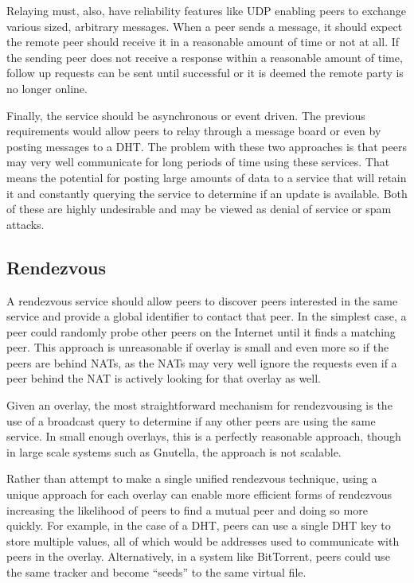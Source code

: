 \documentclass[conference]{IEEEtran}
\begin{document}
Relaying must, also, have reliability features like UDP enabling peers to
exchange various sized, arbitrary messages.  When a peer sends a message, it
should expect the remote peer should receive it in a reasonable amount of time
or not at all.  If the sending peer does not receive a response within a
reasonable amount of time, follow up requests can be sent until successful or
it is deemed the remote party is no longer online.  

Finally, the service should be asynchronous or event driven.  The previous
requirements would allow peers to relay through a message board or even by
posting messages to a DHT.  The problem with these two approaches is that peers
may very well communicate for long periods of time using these services.  That
means the potential for posting large amounts of data to a service that will
retain it and constantly querying the service to determine if an update is
available.  Both of these are highly undesirable and may be viewed as denial of
service or spam attacks.

\subsection{Rendezvous}
\label{rendezvous}

A rendezvous service should allow peers to discover peers interested in the
same service and provide a global identifier to contact that peer.  In the
simplest case, a peer could randomly probe other peers on the Internet until it
finds a matching peer.  This approach is unreasonable if overlay is small and
even more so if the peers are behind NATs, as the NATs may very well ignore the
requests even if a peer behind the NAT is actively looking for that overlay as
well.

Given an overlay, the most straightforward mechanism for rendezvousing is the
use of a broadcast query to determine if any other peers are using the same
service.  In small enough overlays, this is a perfectly reasonable approach,
though in large scale systems such as Gnutella, the approach is not scalable.

Rather than attempt to make a single unified rendezvous technique, using a
unique approach for each overlay can enable more efficient forms of rendezvous
increasing the likelihood of peers to find a mutual peer and doing so more
quickly.  For example, in the case of a DHT, peers can use a single DHT key to
store multiple values, all of which would be addresses used to communicate with
peers in the overlay.  Alternatively, in a system like BitTorrent, peers could
use the same tracker and become ``seeds'' to the same virtual file.
\end{document}
